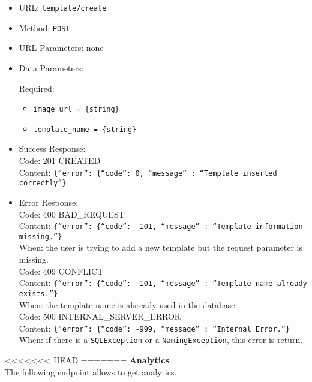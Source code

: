 \begin{itemize}
    \item URL: \texttt{template/create}
    \item Method: \texttt{POST}
    \item URL Parameters: none
    \item Data Parameters:
    
    Required:
    
    \begin{itemize}
        \item \texttt{image\_url = \{string\}}
        \item \texttt{template\_name = \{string\}}
    \end{itemize}
    
    
    \item Success Response:\\
    
    Code: 201 CREATED\\
    Content: \texttt{\{``error'': \{``code'': 0, ``message'' : ``Template inserted correctly''\}}\\
    \item Error Response:\\

    Code: 400 BAD\_REQUEST\\
    Content: \texttt{\{``error'': \{``code'': -101, ``message'' : ``Template information missing.''\}}\\
    When: the user is trying to add a new template but the request parameter is missing.\\

    Code: 409 CONFLICT\\
    Content: \texttt{\{``error'': \{``code'': -101, ``message'' : ``Template name already exists.''\}}\\
    When: the template name is alsready used in the database.\\

    Code: 500 INTERNAL\_SERVER\_ERROR\\
    Content: \texttt{\{``error'': \{``code'': -999, ``message'' : ``Internal Error.''\}}\\
    When: if there is a \texttt{SQLException} or a \texttt{NamingException}, this error is return.\\
    
\end{itemize}

<<<<<<< HEAD
=======
\noindent\textbf{Analytics}\\
The following endpoint allows to get analytics.

